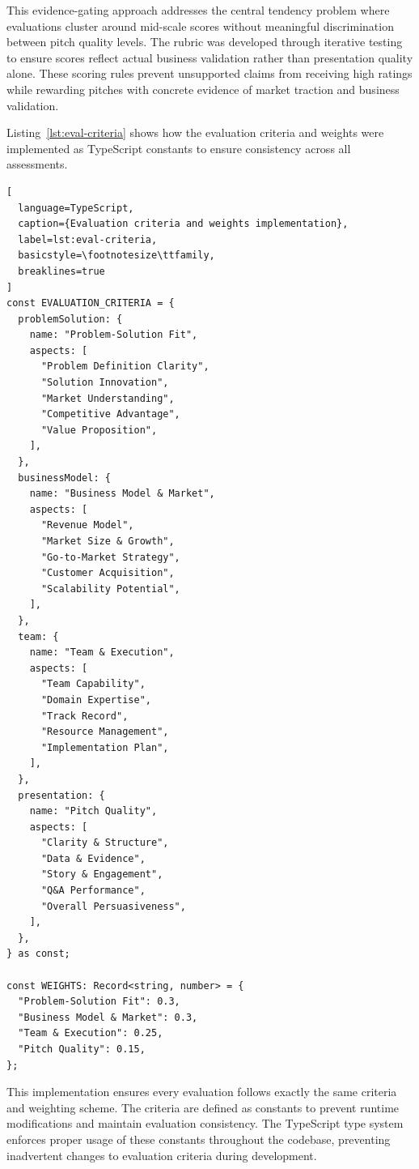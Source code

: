 This evidence-gating approach addresses the central tendency problem where evaluations cluster around mid-scale scores without meaningful discrimination between pitch quality levels. The rubric was developed through iterative testing to ensure scores reflect actual business validation rather than presentation quality alone. These scoring rules prevent unsupported claims from receiving high ratings while rewarding pitches with concrete evidence of market traction and business validation.

Listing~\ref{lst:eval-criteria} shows how the evaluation criteria and weights were implemented as TypeScript constants to ensure consistency across all assessments.

\begin{lstlisting}[
  language=TypeScript,
  caption={Evaluation criteria and weights implementation},
  label=lst:eval-criteria,
  basicstyle=\footnotesize\ttfamily,
  breaklines=true
]
const EVALUATION_CRITERIA = {
  problemSolution: {
    name: "Problem-Solution Fit",
    aspects: [
      "Problem Definition Clarity",
      "Solution Innovation",
      "Market Understanding",
      "Competitive Advantage",
      "Value Proposition",
    ],
  },
  businessModel: {
    name: "Business Model & Market",
    aspects: [
      "Revenue Model",
      "Market Size & Growth",
      "Go-to-Market Strategy",
      "Customer Acquisition",
      "Scalability Potential",
    ],
  },
  team: {
    name: "Team & Execution",
    aspects: [
      "Team Capability",
      "Domain Expertise",
      "Track Record",
      "Resource Management",
      "Implementation Plan",
    ],
  },
  presentation: {
    name: "Pitch Quality",
    aspects: [
      "Clarity & Structure",
      "Data & Evidence",
      "Story & Engagement",
      "Q&A Performance",
      "Overall Persuasiveness",
    ],
  },
} as const;

const WEIGHTS: Record<string, number> = {
  "Problem-Solution Fit": 0.3,
  "Business Model & Market": 0.3,
  "Team & Execution": 0.25,
  "Pitch Quality": 0.15,
};
\end{lstlisting}

This implementation ensures every evaluation follows exactly the same criteria and weighting scheme. The criteria are defined as constants to prevent runtime modifications and maintain evaluation consistency. The TypeScript type system enforces proper usage of these constants throughout the codebase, preventing inadvertent changes to evaluation criteria during development.

\clearpage
